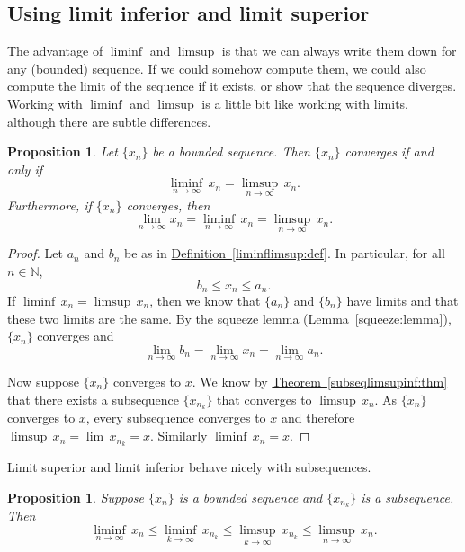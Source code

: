 \documentclass[12pt]{book}
\newcommand{\N}{{\mathbb{N}}}
\theoremstyle{plain}
\newtheorem{prop}[thm]{Proposition}
\theoremstyle{remark}
\theoremstyle{definition}
\theoremstyle{exercise}
\theoremstyle{example}
\newcommand{\thmref}[1]{\hyperref[#1]{Theorem~\ref*{#1}}}
\newcommand{\lemmaref}[1]{\hyperref[#1]{Lemma~\ref*{#1}}}
\newcommand{\defnref}[1]{\hyperref[#1]{Definition~\ref*{#1}}}
\begin{document}
\subsection{Using limit inferior and limit superior}

The advantage of $\liminf$ and $\limsup$ is that we can always write them
down for any (bounded) sequence.
If we could somehow compute them, we could also compute the limit of the
sequence if it exists, or show that the sequence diverges.
Working with $\liminf$ and $\limsup$ is a
little bit like working with limits, although there are subtle differences.

\begin{prop} \label{liminfsupconv:prop}
Let $\{ x_n \}$ be a bounded sequence.  Then $\{ x_n \}$ converges
if and only if
\begin{equation*}
\liminf_{n\to \infty} \, x_n = 
\limsup_{n\to \infty} \, x_n.
\end{equation*}
Furthermore, if $\{ x_n \}$ converges, then
\begin{equation*}
\lim_{n\to \infty} x_n = 
\liminf_{n\to \infty} \, x_n = 
\limsup_{n\to \infty} \, x_n.
\end{equation*}
\end{prop}

\begin{proof}
Let $a_n$ and $b_n$ be as in \defnref{liminflimsup:def}.
In particular, for all $n \in \N$,
\begin{equation*}
b_n \leq x_n \leq a_n .
\end{equation*}
If 
$\liminf \, x_n = \limsup \, x_n$, then we know that $\{ a_n \}$ and $\{ b_n \}$
have limits and that these two limits are the same.  By the squeeze lemma
(\lemmaref{squeeze:lemma}), $\{ x_n \}$ converges and
\begin{equation*}
\lim_{n\to \infty} b_n
=
\lim_{n\to \infty} x_n
=
\lim_{n\to \infty} a_n .
\end{equation*}

Now suppose $\{ x_n \}$ converges to $x$.
We know by
\thmref{subseqlimsupinf:thm}
that there exists a subsequence $\{ x_{n_k} \}$
that converges to $\limsup \, x_n$.
As $\{ x_n \}$ converges to $x$,
every subsequence converges to $x$ and
therefore $\limsup \, x_n = \lim\, x_{n_k} = x$.  Similarly $\liminf \, x_n = x$.
\end{proof}

Limit superior and limit inferior behave nicely
with subsequences.

\begin{prop} \label{prop:subseqslimsupinf}
Suppose $\{ x_n \}$ is a bounded sequence and
$\{ x_{n_k} \}$ is a subsequence.  Then
\begin{equation*}
\liminf_{n\to\infty} \, x_n \leq
\liminf_{k\to\infty} \, x_{n_k} \leq
\limsup_{k\to\infty} \, x_{n_k} \leq
\limsup_{n\to\infty} \, x_n .
\end{equation*}
\end{prop}
\end{document}
